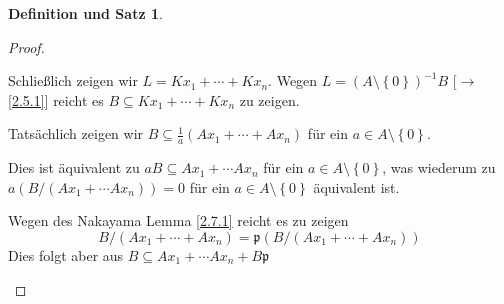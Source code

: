 \documentclass[
twoside=semi,
fontsize=12,
DIV=12, 
cleardoublepage=current,
leqno,
headings=optiontoheadandtoc, 
toc=idx
]{scrbook}
\newcommand{\set}[1]{\left\{ #1 \right\}}
\theoremstyle{definition}
\newtheorem{def-satz}[definition]{Definition und Satz}
\begin{document}
\begin{def-satz}
\begin{proof}
\begin{enumerate}[(a)]
 				Schlie\ss lich zeigen wir $L = Kx_1 + \cdots + Kx_n$. Wegen $L = (A \setminus \set{0})^{-1}B$ [$\to$ \ref{2.5.1}] reicht es $B \subseteq Kx_1 + \cdots + Kx_n$ zu zeigen.  
 				
 				Tats\"achlich zeigen wir $B \subseteq \frac{1}{a} (Ax_1 + \cdots + Ax_n)$ f\"ur ein $a \in A \setminus \set{0}$.
 				
 				Dies ist \"aquivalent zu $aB \subseteq Ax_1 + \cdots Ax_n$ f\"ur ein $a \in A \setminus \set{0}$, was wiederum zu $a(B/(Ax_1 + \cdots Ax_n)) = 0$ f\"ur ein $a \in A \setminus \set{0}$ \"aquivalent ist.
 				
 				Wegen des Nakayama Lemma \ref{2.7.1} reicht es zu zeigen \[B/(Ax_1 + \cdots+ Ax_n) = \mathfrak{p}(B/(Ax_1 + \cdots + Ax_n))\] 
 				Dies folgt aber aus $B \subseteq Ax_1 + \cdots Ax_n + B\mathfrak{p}$
 			\end{enumerate}
 		\end{proof}
 	\end{def-satz}
 	
\end{document}
